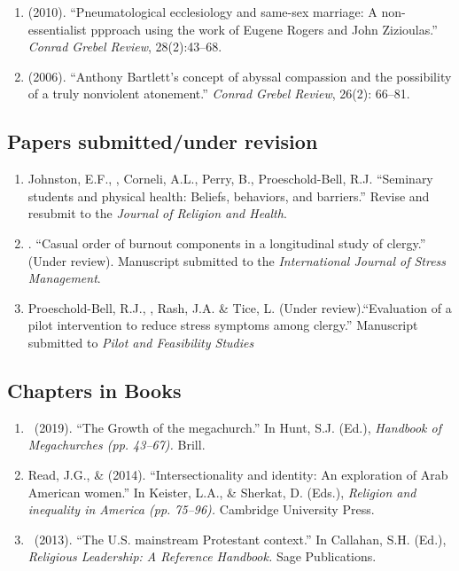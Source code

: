 \begin{enumerate}
\item \Eagle \hspace{.01em} (2010). ``Pneumatological ecclesiology and same-sex marriage: A non-essentialist ppproach using the work of Eugene Rogers and John Zizioulas.'' \emph{Conrad Grebel Review}, 28(2):43--68.

\item \Eagle\hspace{.01em} (2006). ``Anthony Bartlett's concept of abyssal compassion and the possibility of a truly nonviolent atonement.'' \emph{Conrad Grebel Review}, 26(2): 66--81.	

\end{enumerate}

\subsection*{Papers submitted/under revision}
\begin{enumerate} 

\item Johnston, E.F., \Eagle, Corneli, A.L., Perry, B., Proeschold-Bell, R.J. ``Seminary students and physical health: Beliefs, behaviors, and barriers.'' Revise and resubmit to the \textit{Journal of Religion and Health}.

\item \Eagle. ``Casual order of burnout components in a longitudinal study of clergy.'' (Under review). Manuscript submitted to the \textit{International Journal of Stress Management}.

\item Proeschold-Bell, R.J., \Eagle, Rash, J.A. \& Tice, L. (Under review).``Evaluation of a pilot intervention to reduce stress symptoms among clergy.'' Manuscript submitted to \textit{Pilot and Feasibility Studies}

\end{enumerate}

\subsection*{Chapters in Books}
\begin{enumerate} 
\item \Eagle\ (2019). ``The Growth of the megachurch.'' In Hunt, S.J. (Ed.), \emph{Handbook of Megachurches (pp. 43--67).} Brill.

\item Read, J.G., \& \Eagle \hspace{.01em}  (2014). ``Intersectionality and identity: An exploration of Arab American women.'' In Keister, L.A., \& Sherkat, D. (Eds.), \emph{Religion and inequality in America (pp. 75--96).} Cambridge University Press.

\item \Eagle\ (2013). ``The U.S. mainstream Protestant context.'' In Callahan, S.H. (Ed.), \emph{Religious Leadership: A Reference Handbook.} Sage Publications.
\end{enumerate}

